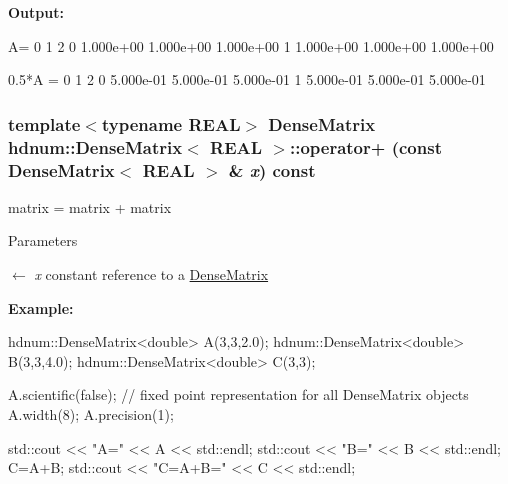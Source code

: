{\bfseries Output:} \begin{DoxyVerb}
A=
                      0          1          2 
          0   1.000e+00  1.000e+00  1.000e+00 
          1   1.000e+00  1.000e+00  1.000e+00 

0.5*A =
                      0          1          2 
          0   5.000e-01  5.000e-01  5.000e-01 
          1   5.000e-01  5.000e-01  5.000e-01 
	  \end{DoxyVerb}
 \hypertarget{classhdnum_1_1DenseMatrix_ab31d1c60b8078d01bd131e36a486f091}{
\subsubsection[{operator+}]{\setlength{\rightskip}{0pt plus 5cm}template$<$typename REAL$>$ {\bf DenseMatrix} {\bf hdnum::DenseMatrix}$<$ REAL $>$::operator+ (const {\bf DenseMatrix}$<$ REAL $>$ \& {\em x}) const}}
\label{classhdnum_1_1DenseMatrix_ab31d1c60b8078d01bd131e36a486f091}


matrix = matrix + matrix 


\begin{DoxyParams}{Parameters}
\item[\mbox{$\leftarrow$} {\em x}]constant reference to a \hyperlink{classhdnum_1_1DenseMatrix}{DenseMatrix}\end{DoxyParams}
{\bfseries Example:} 
\begin{DoxyCode}
  hdnum::DenseMatrix<double> A(3,3,2.0);
  hdnum::DenseMatrix<double> B(3,3,4.0);
  hdnum::DenseMatrix<double> C(3,3);

  A.scientific(false); // fixed point representation for all DenseMatrix objects
  A.width(8);
  A.precision(1);

  std::cout << "A=" << A << std::endl;
  std::cout << "B=" << B << std::endl;
  C=A+B;
  std::cout << "C=A+B=" << C << std::endl;
\end{DoxyCode}


